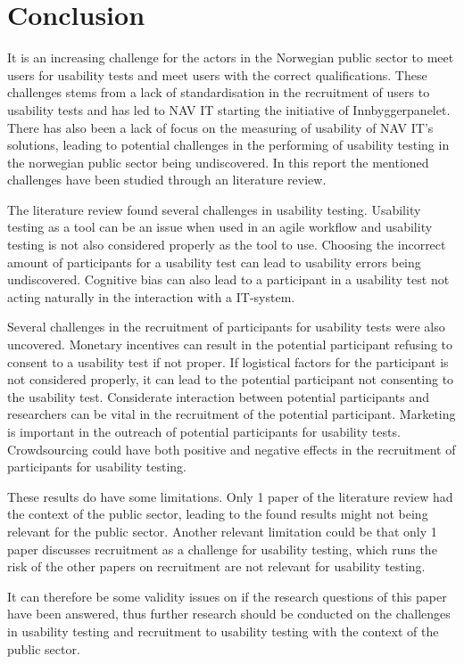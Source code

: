 \section{Conclusion}
It is an increasing challenge for the actors in the Norwegian public sector to meet users for usability tests and meet users with the correct qualifications. These challenges stems from a lack of standardisation in the recruitment of users to usability tests and has led to NAV IT starting the initiative of Innbyggerpanelet. There has also been a lack of focus on the measuring of usability of NAV IT's solutions, leading to potential challenges in the performing of usability testing in the norwegian public sector being undiscovered. In this report the mentioned challenges have been studied through an literature review.

The literature review found several challenges in usability testing. Usability testing as a tool can be an issue when used in an agile workflow and usability testing is not also considered properly as the tool to use. Choosing the incorrect amount of participants for a usability test can lead to usability errors being undiscovered. Cognitive bias can also lead to a participant in a usability test not acting naturally in the interaction with a IT-system.

Several challenges in the recruitment of participants for usability tests were also uncovered. Monetary incentives can result in the potential participant refusing to consent to a usability test if not proper. If logistical factors for the participant is not considered properly, it can lead to the potential participant not consenting to the usability test. Considerate interaction between potential participants and researchers can be vital in the recruitment of the potential participant. Marketing is important in the outreach of potential participants for usability tests. Crowdsourcing could have both positive and negative effects in the recruitment of participants for usability testing.

These results do have some limitations. Only 1 paper of the literature review had the context of the public sector, leading to the found results might not being relevant for the public sector. Another relevant limitation could be that only 1 paper discusses recruitment as a challenge for usability testing, which runs the risk of the other papers on recruitment are not relevant for usability testing.

It can therefore be some validity issues on if the research questions of this paper have been answered, thus further research should be conducted on the challenges in usability testing and recruitment to usability testing with the context of the public sector.
